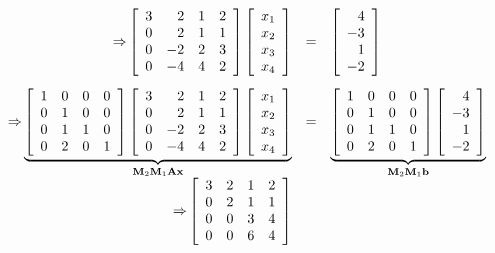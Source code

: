\[
\begin{array}{rcl} {\Rightarrow} 
\left[\begin{array}{rrrr}3&2&1&2\\ 0&2&1&1\\ 0&-2&2&3\\0&-4&4&2\end{array}\right] 
\left[\begin{array}{r}x_1\\x_2\\x_3\\x_4\end{array}\right]
&=&
\left[\begin{array}{r}4\\-3\\1\\-2\end{array}\right] \;\;\; \\ \vspace*{-1mm} \\
{\Rightarrow} \underbrace{
\left[\begin{array}{rrrr}1&0&0&0\\ 0&1&0&0\\ 0 &1&1&0\\ 0&2&0&1\end{array}\right]
\left[\begin{array}{rrrr}3&2&1&2\\ 0&2&1&1\\ 0&-2&2&3\\0&-4&4&2\end{array}\right] 
\left[\begin{array}{r}x_1\\x_2\\x_3\\x_4\end{array}\right]
}_{ {\mathbf{M}_2} {\mathbf{M}_1\mathbf{A}\mathbf{x}}}
& = &
\underbrace{\left[\begin{array}{rrrr}1&0&0&0\\ 0&1&0&0\\ 0 &1&1&0\\ 0&2&0&1\end{array}\right]
\left[\begin{array}{r}4\\-3\\1\\-2\end{array}\right]}_{ {\mathbf{M}_2} {\mathbf{M}_1\mathbf{b}}}\\
{\Rightarrow}  \left[\begin{array}{rrrr}3&2&1&2\\ 0&2&1&1\\ 0&0&3&4\\0&0&6&4\end{array}\right] 

\end{array}\]
